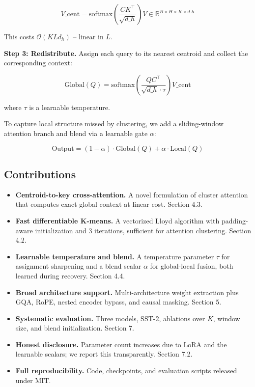 \[
V\_{\text{cent}} = \text{softmax}\!\left(\frac{C K^\top}{\sqrt{d\_h}}\right) V \in \mathbb{R}^{B \times H \times K \times d\_h}
\]

This costs $\mathcal{O}(K L d_h)$ -- linear in $L$.

\textbf{Step 3: Redistribute.} Assign each query to its nearest centroid and 
collect the corresponding context:

\[
\text{Global}(Q) = \text{softmax}\!\left(\frac{Q C^\top}{\sqrt{d\_h} \cdot \tau}\right) V\_{\text{cent}}
\]

where $\tau$ is a learnable temperature.

To capture local structure missed by clustering, we add a sliding-window 
attention branch and blend via a learnable gate $\alpha$:

\[
\text{Output} = (1 - \alpha) \cdot \text{Global}(Q) + \alpha \cdot \text{Local}(Q)
\]

\subsection{Contributions}

\begin{itemize}
\item \textbf{Centroid-to-key cross-attention.} A novel formulation of cluster
  attention that computes exact global context at linear cost. Section 4.3.
\item \textbf{Fast differentiable K-means.} A vectorized Lloyd algorithm with
  padding-aware initialization and 3 iterations, sufficient for attention
  clustering. Section 4.2.
\item \textbf{Learnable temperature and blend.} A temperature parameter $\tau$ for
  assignment sharpening and a blend scalar $\alpha$ for global-local fusion,
  both learned during recovery. Section 4.4.
\item \textbf{Broad architecture support.} Multi-architecture weight extraction plus
  GQA, RoPE, nested encoder bypass, and causal masking. Section 5.
\item \textbf{Systematic evaluation.} Three models, SST-2, ablations over $K$,
  window size, and blend initialization. Section 7.
\item \textbf{Honest disclosure.} Parameter count increases due to LoRA and the
  learnable scalars; we report this transparently. Section 7.2.
\item \textbf{Full reproducibility.} Code, checkpoints, and evaluation scripts
  released under MIT.

\end{itemize}
